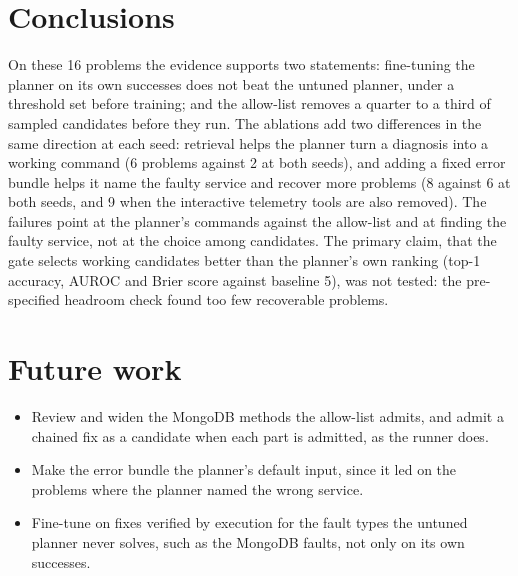 \documentclass[10pt,conference]{IEEEtran}
\begin{document}
\section{Conclusions}

On these 16 problems the evidence supports two statements: fine-tuning the planner on its own
successes does not beat the untuned planner, under a threshold set before training; and the
allow-list removes a quarter to a third of sampled candidates before they run. The
ablations add two differences in the same direction at each seed: retrieval helps the planner turn
a diagnosis into a working command (6 problems against 2 at both seeds), and adding a fixed error
bundle helps it name the faulty service and recover more problems (8 against 6 at both seeds, and
9 when the interactive telemetry tools are also removed). The failures point at the planner's commands against the allow-list and at
finding the faulty service, not at the choice among candidates. The primary claim, that the gate
selects working candidates better than the planner's own ranking (top-1 accuracy, AUROC and Brier
score against baseline 5), was not tested: the pre-specified headroom check found too few
recoverable problems.

\section{Future work}

\begin{itemize}
\item Review and widen the MongoDB methods the allow-list admits, and admit a chained fix as a
candidate when each part is admitted, as the runner does.
\item Make the error bundle the planner's default input, since it led on the problems where the
planner named the wrong service.
\item Fine-tune on fixes verified by execution for the fault types the untuned planner never solves,
such as the MongoDB faults, not only on its own successes.
\end{itemize}



\end{document}
